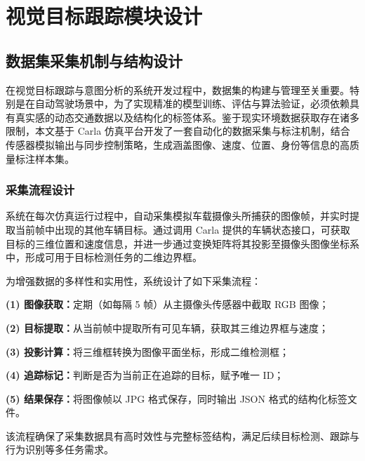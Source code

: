 \chapter{视觉目标跟踪模块设计}

\section{数据集采集机制与结构设计}

在视觉目标跟踪与意图分析的系统开发过程中，数据集的构建与管理至关重要。特别是在自动驾驶场景中，为了实现精准的模型训练、评估与算法验证，必须依赖具有真实感的动态交通数据以及结构化的标签体系。鉴于现实环境数据获取存在诸多限制，本文基于 Carla 仿真平台开发了一套自动化的数据采集与标注机制，结合传感器模拟输出与同步控制策略，生成涵盖图像、速度、位置、身份等信息的高质量标注样本集。

\subsection{采集流程设计}

系统在每次仿真运行过程中，自动采集模拟车载摄像头所捕获的图像帧，并实时提取当前帧中出现的其他车辆目标。通过调用 Carla 提供的车辆状态接口，可获取目标的三维位置和速度信息，并进一步通过变换矩阵将其投影至摄像头图像坐标系中，形成可用于目标检测任务的二维边界框。

为增强数据的多样性和实用性，系统设计了如下采集流程：

\textbf{(1)	图像获取：}定期（如每隔 5 帧）从主摄像头传感器中截取 RGB 图像；

\textbf{(2)	目标提取：}从当前帧中提取所有可见车辆，获取其三维边界框与速度；

\textbf{(3)	投影计算：}将三维框转换为图像平面坐标，形成二维检测框；

\textbf{(4)	追踪标记：}判断是否为当前正在追踪的目标，赋予唯一 ID；

\textbf{(5)	结果保存：}将图像帧以 JPG 格式保存，同时输出 JSON 格式的结构化标签文件。

该流程确保了采集数据具有高时效性与完整标签结构，满足后续目标检测、跟踪与行为识别等多任务需求。

